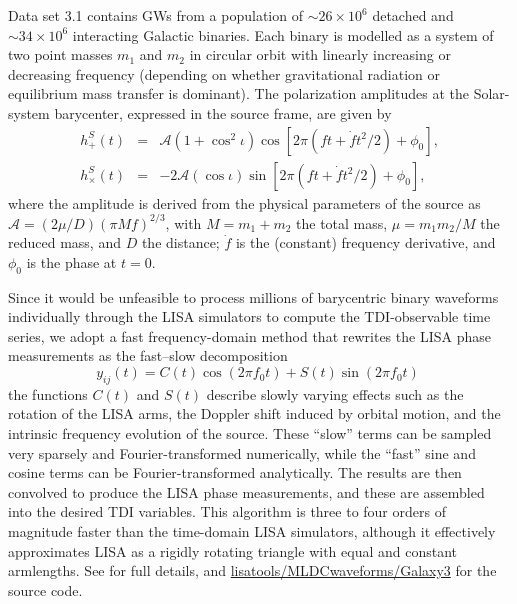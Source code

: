 \documentclass{iopart}
\begin{document}
Data set 3.1 contains GWs from a population of $\sim 26 \times 10^6$ detached and $\sim 34 \times 10^6$ interacting Galactic binaries. Each binary is modelled as a system of two point masses $m_1$ and $m_2$ in circular orbit with linearly increasing or decreasing frequency (depending on whether gravitational radiation or equilibrium mass transfer is dominant). The polarization amplitudes at the Solar-system barycenter, expressed in the source frame, are given by
%
\begin{eqnarray}
h^S_+(t) & = & \mathcal{A} \left(1 + \cos^2{\iota}\right) \cos[2\pi (f t + \dot{f} t^2 / 2) + \phi_0], \\
h^S_\times(t) & = & -2 \mathcal{A} (\cos{\iota}) \sin[2\pi (f t + \dot{f} t^2 / 2) + \phi_0], \nonumber
\end{eqnarray}
%
where the amplitude is derived from the physical parameters of the source as $\mathcal{A} = (2 \mu / D) (\pi M f)^{2/3}$, with $M = m_1 + m_2$ the total mass, $\mu = m_1 m_2 / M $ the reduced mass, and $D$ the distance; $\dot{f}$ is the (constant) frequency derivative, and $\phi_0$ is the phase at $t = 0$.

Since it would be unfeasible to process millions of barycentric binary waveforms individually through the LISA simulators to compute the TDI-observable time series, we adopt a fast frequency-domain method \cite{Cornish:2007if} that rewrites the LISA phase measurements as the fast--slow decomposition
%
\begin{equation}
y_{ij}(t) = C(t) \cos(2 \pi f_0 t) + S(t) \sin(2 \pi f_0 t) \;
\end{equation}
%
the functions $C(t)$ and $S(t)$ describe slowly varying effects such as the rotation of the LISA arms, the Doppler shift induced by orbital motion, and the intrinsic frequency evolution of the source. These ``slow'' terms can be sampled very sparsely and Fourier-transformed numerically, while the ``fast'' sine and cosine terms can be Fourier-transformed analytically. The results are then convolved to produce the LISA phase measurements, and these are assembled into the desired TDI variables. This algorithm is three to four orders of magnitude faster than the time-domain LISA simulators, although it effectively approximates LISA as a rigidly rotating triangle with equal and constant armlengths. See \cite{Cornish:2007if} for full details, and \url{lisatools/MLDCwaveforms/Galaxy3} for the source code.
\end{document}
